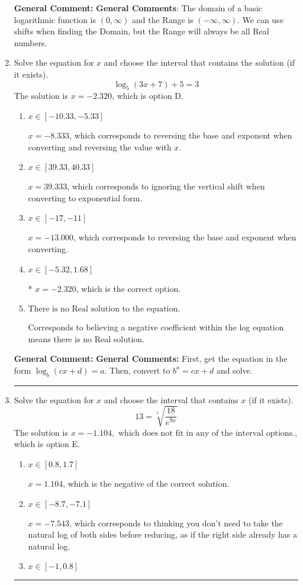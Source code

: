 \documentclass{extbook}[14pt]
\newcommand{\litem}[1]{\item #1

\rule{\textwidth}{0.4pt}}
\begin{document}
\begin{enumerate}
{\textbf{General Comment:} \textbf{General Comments}: The domain of a basic logarithmic function is $(0, \infty)$ and the Range is $(-\infty, \infty)$. We can use shifts when finding the Domain, but the Range will always be all Real numbers.
}
\litem{
Solve the equation for $x$ and choose the interval that contains the solution (if it exists).
\[ \log_{5}{(3x+7)}+5 = 3 \]The solution is \( x = -2.320 \), which is option D.\begin{enumerate}[label=\Alph*.]
\item \( x \in [-10.33, -5.33] \)

$x = -8.333$, which corresponds to reversing the base and exponent when converting and reversing the value with $x$.
\item \( x \in [39.33, 40.33] \)

$x = 39.333$, which corresponds to ignoring the vertical shift when converting to exponential form.
\item \( x \in [-17, -11] \)

$x = -13.000$, which corresponds to reversing the base and exponent when converting.
\item \( x \in [-5.32, 1.68] \)

* $x = -2.320$, which is the correct option.
\item \( \text{There is no Real solution to the equation.} \)

Corresponds to believing a negative coefficient within the log equation means there is no Real solution.
\end{enumerate}

\textbf{General Comment:} \textbf{General Comments:} First, get the equation in the form $\log_b{(cx+d)} = a$. Then, convert to $b^a = cx+d$ and solve.
}
\litem{
 Solve the equation for $x$ and choose the interval that contains $x$ (if it exists).
\[  13 = \sqrt[5]{\frac{18}{e^{9x}}} \]The solution is \( x = -1.104, \text{ which does not fit in any of the interval options.} \), which is option E.\begin{enumerate}[label=\Alph*.]
\item \( x \in [0.8, 1.7] \)

$x = 1.104$, which is the negative of the correct solution.
\item \( x \in [-8.7, -7.1] \)

$x = -7.543$, which corresponds to thinking you don't need to take the natural log of both sides before reducing, as if the right side already has a natural log.
\item \( x \in [-1, 0.8] \)


\end{enumerate}}
\end{enumerate}
\end{document}
